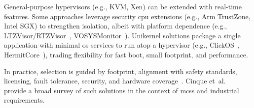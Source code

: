General-purpose hypervisors (e.g., KVM, Xen) can be extended with real-time
features. Some approaches leverage security \gls{cpu} extensions (e.g., Arm
TrustZone, Intel SGX) to strengthen isolation, albeit with platform dependence
(e.g., LTZVisor/RTZVisor~\cite{pinto2016towards,rtzvisor}, VOSYSMonitor~\cite{lucas2017vosysmonitor,lucas_vosysmonitor_2018}).
Unikernel solutions package a single application with minimal \gls{os} services
to run atop a hypervisor (e.g., ClickOS~\cite{martins2014clickos},
HermitCore~\cite{lankes2016hermitcore}), trading flexibility for fast boot, small footprint, and performance.

In practice, selection is guided by footprint, alignment with safety standards,
licensing, fault tolerance, security,
and hardware coverage~\cite{cinque2022virtualizing}. Cinque
et~al.~\cite{cinque2022virtualizing} provide a
broad survey of such solutions in the context of \glspl{mcs} and industrial
requirements.







